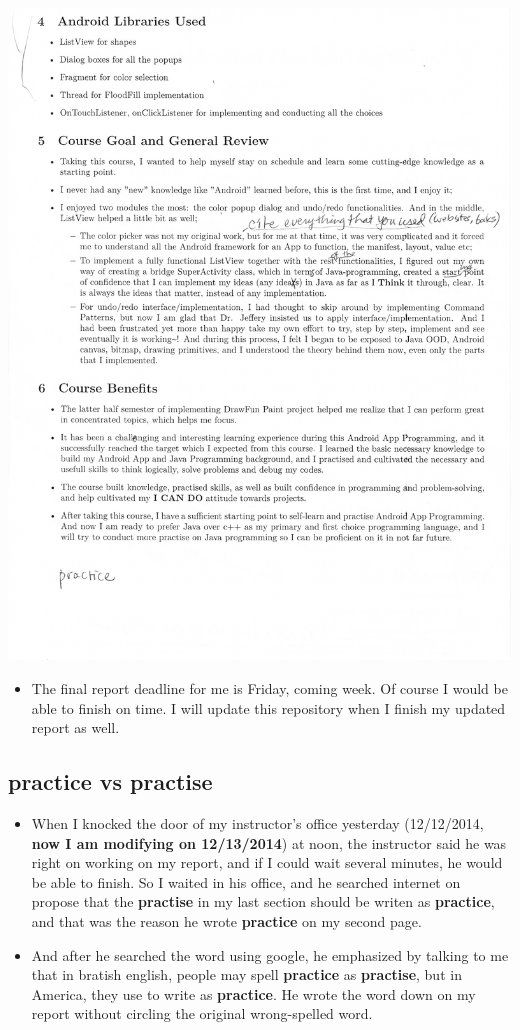 \documentclass[9pt,b5paper]{article}
\begin{document}
\includegraphics[width=.9\linewidth]{./IMG_0002.jpg}
\begin{itemize}
\item The final report deadline for me is Friday, coming week. Of course I would be able to finish on time. I will update this repository when I finish my updated report as well.
\end{itemize}
\subsection{practice vs practise}
\label{sec-7-4}
\begin{itemize}
\item When I knocked the door of my instructor's office yesterday (12/12/2014, \textbf{now I am modifying on 12/13/2014}) at noon, the instructor said he was right on working on my report, and if I could wait several minutes, he would be able to finish. So I waited in his office, and he searched internet on propose that the \textbf{practise} in my last section should be writen as \textbf{practice}, and that was the reason he wrote \textbf{practice} on my second page.
\item And after he searched the word using google, he emphasized by talking to me that in bratish english, people may spell \textbf{practice} as \textbf{practise}, but in America, they use to write as \textbf{practice}. He wrote the word down on my report without circling the original wrong-spelled word.
\end{itemize}
\end{document}
